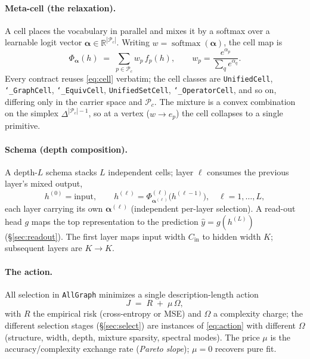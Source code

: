 \documentclass[11pt]{article}
\newcommand{\allowbreakhere}{\discretionary{}{}{}}
\newcommand{\code}[1]{\texttt{\def\_{\char`_\allowbreakhere}#1}}
\newcommand{\R}{\mathbb{R}}
\newcommand{\Pcal}{\mathcal{P}}
\newcommand{\alphapar}{\bm{\alpha}}
\newcommand{\softmax}{\operatorname{softmax}}
\newcommand{\Cin}{C_{\mathrm{in}}}
\begin{document}
\paragraph{Meta-cell (the relaxation).} A cell places the vocabulary in parallel and mixes it by a softmax
over a learnable logit vector $\alphapar\in\R^{|\Pcal_c|}$. Writing $w=\softmax(\alphapar)$, the cell map is
\begin{equation}
\label{eq:cell}
\Phi_{\alphapar}(h)\;=\;\sum_{p\in\Pcal_c} w_p\, f_p(h),
\qquad w_p=\frac{e^{\alpha_p}}{\sum_{q}e^{\alpha_q}} .
\end{equation}
Every contract reuses \eqref{eq:cell} verbatim; the cell classes are
\code{UnifiedCell}, \code{\_GraphCell},
\code{\_EquivCell}, \code{UnifiedSetCell}, \code{\_OperatorCell}, and so on, differing only in the
carrier space and $\Pcal_c$. The mixture is a convex combination on the simplex $\Delta^{|\Pcal_c|-1}$,
so at a vertex ($w\to e_p$) the cell collapses to a single primitive.

\paragraph{Schema (depth composition).} A depth-$L$ schema stacks $L$ independent cells; layer
$\ell$ consumes the previous layer's mixed output,
\begin{equation}
\label{eq:depth}
h^{(0)}=\text{input},\qquad h^{(\ell)}=\Phi^{(\ell)}_{\alphapar^{(\ell)}}\!\big(h^{(\ell-1)}\big),\quad \ell=1,\dots,L,
\end{equation}
each layer carrying its own $\alphapar^{(\ell)}$ (independent per-layer selection). A read-out head $g$ maps
the top representation to the prediction $\hat y=g(h^{(L)})$ (\S\ref{sec:readout}). The first layer maps
input width $\Cin$ to hidden width $K$; subsequent layers are $K\to K$.

\paragraph{The action.} All selection in \code{AllGraph} minimizes a single description-length action
\begin{equation}
\label{eq:action}
J \;=\; R \;+\; \mu\,\Omega,
\end{equation}
with $R$ the empirical risk (cross-entropy or MSE) and $\Omega$ a complexity charge; the different
selection stages (\S\ref{sec:select}) are instances of \eqref{eq:action} with different $\Omega$
(structure, width, depth, mixture sparsity, spectral modes). The price $\mu$ is the accuracy/complexity
exchange rate (\emph{Pareto slope}); $\mu=0$ recovers pure fit.
\end{document}
